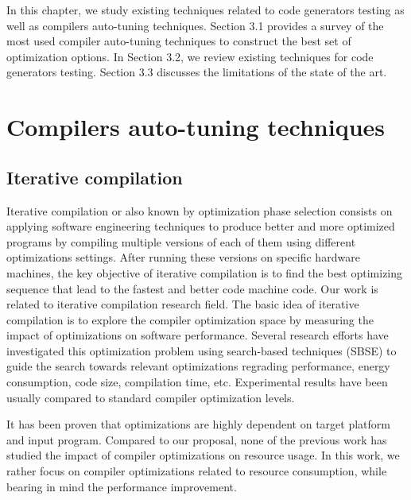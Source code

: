 In this chapter, we study existing techniques related to code generators testing as well as compilers auto-tuning techniques.
Section 3.1 provides a survey of the most used compiler auto-tuning techniques to construct the best set of optimization options. In Section 3.2, we review existing techniques for code generators testing. Section 3.3 discusses the limitations of the state of the art.
\section{Compilers auto-tuning techniques}

\subsection{Iterative compilation}
Iterative compilation or also known by optimization phase selection consists on applying software engineering techniques to produce better and more optimized programs by compiling multiple versions of each of them using different optimizations settings. After running these versions on specific hardware machines, the key objective of iterative compilation is to find the best optimizing sequence that lead to the fastest and better code machine code. 
Our work is related to iterative compilation research field.
The basic idea of iterative compilation is to explore the compiler optimization space by measuring the impact of optimizations on software performance.
Several research efforts have investigated this optimization problem using search-based techniques (SBSE) to guide the search towards relevant optimizations regrading performance, energy consumption, code size, compilation time, etc. Experimental results have been usually compared to standard compiler optimization levels.  

It has been proven that optimizations are highly dependent on target platform and input program. 
Compared to our proposal, none of the previous work has studied the impact of compiler optimizations on resource usage. In this work, we rather focus on compiler optimizations related to resource consumption, while bearing in mind the performance improvement.

